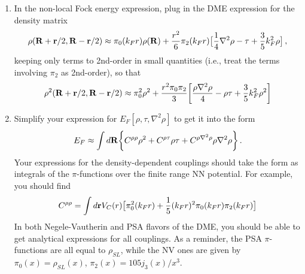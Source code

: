 \begin{enumerate}
\item In the non-local Fock energy expression, plug in the DME expression for the density matrix
\begin{eqnarray}
\rho({\bf R}+{\bf r}/2,{\bf R}-{\bf r}/2) \approx \pi_0(k_Fr)\rho({\bf R}) + \frac{r^2}{6}\pi_2(k_Fr)\bigl[\frac{1}{4}\nabla^2\rho - \tau + \frac{3}{5}k_F^2\rho\bigr]\,,
\end{eqnarray}
keeping only terms to 2nd-order in small quantities (i.e., treat the terms involving $\pi_2$ as 2nd-order), so that
\begin{equation}
\rho^2({\bf R}+{\bf r}/2,{\bf R}-{\bf r}/2) \approx \pi_0^2\rho^2 + \frac{r^2\pi_0\pi_2}{3}\biggl[\frac{\rho\nabla^2\rho}{4} - \rho\tau + \frac{3}{5}k_F^2\rho^2\biggr]
\end{equation}
 \item Simplify your expression for $E_{F}[\rho,\tau,\nabla^2\rho]$ to get it into the form
 \begin{equation}
 E_{F} \approx \int d{\bf R} \biggl\{ C^{\rho\rho}\rho^2 + C^{\rho\tau}\rho\tau + C^{\rho\nabla^2\rho}\rho\nabla^2\rho\biggr\}\,.
 \end{equation}
 Your expressions for the density-dependent couplings should take the form as integrals of the $\pi$-functions over the finite range NN potential.  For example, you should find
 \begin{equation}
 C^{\rho\rho} = \int d{\bf r} V_C(r)\bigl[\pi_0^2(k_Fr) + \frac{1}{5}(k_Fr)^2\pi_0(k_Fr)\pi_2(k_Fr)\bigr]
 \end{equation}
 In both Negele-Vautherin and PSA flavors of the DME, you should be able to get analytical expressions  for all couplings. As a reminder, the PSA $\pi$-functions are all equal to $\rho_{SL}$, while the NV ones are given by $\pi_0(x) = \rho_{SL}(x)$, $\pi_2(x) = 105j_3(x)/x^3$.

\end{enumerate}




